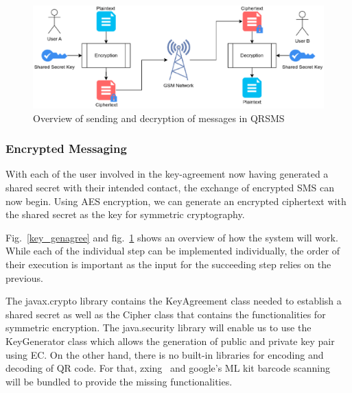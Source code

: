 \documentclass[journal]{./IEEE/IEEEtran}
\begin{document}
\begin{figure}
    \centering
    \includegraphics[width=6in]{images/encrypted_messaging.eps}
    \caption{Overview of sending and decryption of messages in
    QRSMS}
    \label{encrypted}
\end{figure}

\subsubsection{Encrypted Messaging}
With each of the user involved in the key-agreement now having generated a
shared secret with their intended contact, the exchange of encrypted SMS
can now begin. Using AES encryption, we can generate an encrypted ciphertext
with the shared secret as the key for symmetric cryptography. 

Fig.~\ref{key_genagree} and fig.~\ref{encrypted} shows an overview of how 
the system will work. While each of the individual step can be implemented 
individually, the order of their execution is important as the input for the 
succeeding step relies on the previous. 

The javax.crypto library contains the KeyAgreement class needed to
establish a shared secret as well as the Cipher class that contains the 
functionalities for symmetric encryption. The java.security library will
enable us to use the KeyGenerator class which allows the generation of
public and private key pair using EC. On the other hand, there is no built-in
libraries for encoding and decoding of QR code. For that, zxing~\cite{zxing}
and google's ML kit barcode scanning~\cite{mlkit} will be bundled to 
provide the missing functionalities.


\end{document}
